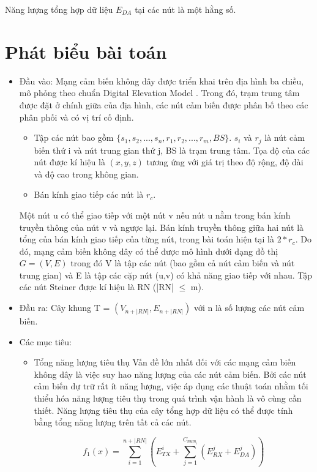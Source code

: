 \documentclass{hust}
\begin{document}
Năng lượng tổng hợp dữ liệu $E_{DA}$ tại các nút là một hằng số.


\section{Phát biểu bài toán} \label{problem}
\begin{itemize}
	\item 
	Đầu vào: Mạng cảm biến không dây được triển khai trên địa hình ba chiều, mô phỏng theo chuẩn Digital Elevation Model \cite{mukherjee2013evaluation}. Trong đó, trạm trung tâm được đặt ở chính giữa của địa hình, các nút cảm biến được phân bố theo các phân phối và có vị trí cố định. 
	\begin{itemize}
		\item
		Tập các nút bao gồm $\{s_{1},s_{2},...,s_{n},r_{1},r_{2},...,r_{m},BS\}$. $s_{i}$ và $r_{j}$ là nút cảm biến thứ i và nút trung gian thứ j, BS là trạm trung tâm. Tọa độ của các nút được kí hiệu là $(x,y,z)$ tương ứng với giá trị theo độ rộng, độ dài và độ cao trong không gian.
		\item
		Bán kính giao tiếp các nút là $r_{c}$.
	\end{itemize}
	Một nút u có thể giao tiếp với một nút v nếu nút u nằm trong bán kính truyền thông của nút v và ngược lại. Bán kính truyền thông giữa hai nút là tổng của bán kính giao tiếp của từng nút, trong bài toán hiện tại là $2*r_{c}$. Do đó, mạng cảm biến không dây có thể được mô hình dưới dạng đồ thị $G = (V,E)$ trong đó V là tập các nút (bao gồm cả nút cảm biến và nút trung gian) và E là tập các cặp nút (u,v) có khả năng giao tiếp với nhau. Tập các nút Steiner được kí hiệu là RN (|RN| $\leq$ m).
	
	\item
	Đầu ra:  Cây khung T = $(V_{n+|RN|},E_{n+|RN|})$ với n là số lượng các nút cảm biến.
	
	\item
	Các mục tiêu:
	\begin{itemize}
		\item Tổng năng lượng tiêu thụ
		Vấn đề lớn nhất đối với các mạng cảm biến không dây là việc suy hao năng lượng của các nút cảm biến. Bởi các nút cảm biến dự trữ rất ít năng lượng, việc áp dụng các thuật toán nhằm tối thiểu hóa năng lượng tiêu thụ trong quá trình vận hành là vô cùng cần thiết. Năng lượng tiêu thụ của cây tổng hợp dữ liệu có thể được tính bằng tổng năng lượng trên tất cả các nút.
		
		\begin{equation}
		f_1(x) = \sum_{i=1}^{n + |RN|} (E^i_{TX} + \sum_{j=1}^{C_{num_i}} (E_{RX}^j + E_{DA}^j))
		\end{equation}
		

\end{itemize}
\end{itemize}
\end{document}
